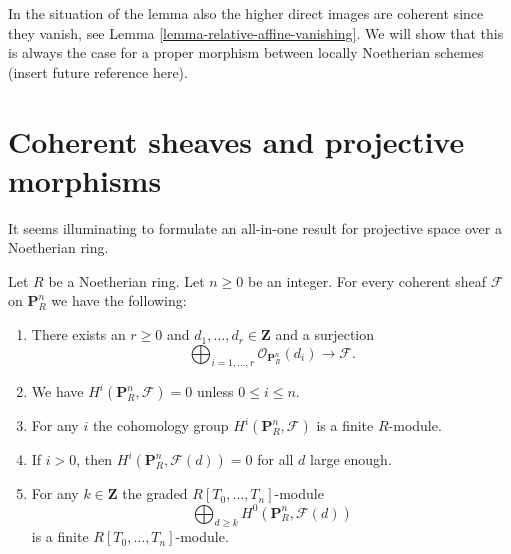 \noindent
In the situation of the lemma also the higher direct images are
coherent since they vanish, see Lemma \ref{lemma-relative-affine-vanishing}.
We will show that this is always the case for a proper morphism
between locally Noetherian schemes (insert future reference here).












\section{Coherent sheaves and projective morphisms}
\label{section-coherent-projective}

\noindent
It seems illuminating to formulate an all-in-one result for
projective space over a Noetherian ring.

\begin{lemma}
\label{lemma-coherent-projective}
Let $R$ be a Noetherian ring.
Let $n \geq 0$ be an integer.
For every coherent sheaf $\mathcal{F}$ on $\mathbf{P}^n_R$
we have the following:
\begin{enumerate}
\item There exists an $r \geq 0$ and
$d_1, \ldots, d_r \in \mathbf{Z}$ and a surjection
$$
\bigoplus\nolimits_{i = 1, \ldots, r}
\mathcal{O}_{\mathbf{P}^n_R}(d_i)
\longrightarrow
\mathcal{F}.
$$
\item We have $H^i(\mathbf{P}^n_R, \mathcal{F}) = 0$ unless
$0 \leq i \leq n$.
\item For any $i$ the cohomology group $H^i(\mathbf{P}^n_R, \mathcal{F})$
is a finite $R$-module.
\item If $i > 0$, then
$H^i(\mathbf{P}^n_R, \mathcal{F}(d)) = 0$ for all $d$ large enough.
\item For any $k \in \mathbf{Z}$ the graded $R[T_0, \ldots, T_n]$-module
$$
\bigoplus\nolimits_{d \geq k} H^0(\mathbf{P}^n_R, \mathcal{F}(d))
$$
is a finite $R[T_0, \ldots, T_n]$-module.
\end{enumerate}
\end{lemma}

